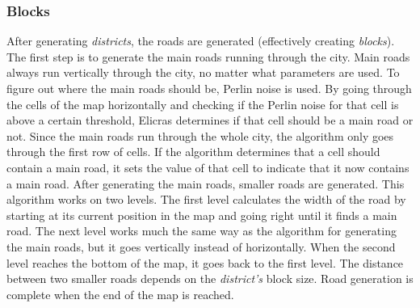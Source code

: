		\subsubsection{Blocks}
		After generating \textit{districts}, the roads are generated (effectively creating \textit{blocks}). The first step is to generate the main roads running through the city. Main roads always run vertically through the city, no matter what parameters are used. To figure out where the main roads should be, Perlin noise is used. By going through the cells of the map horizontally and checking if the Perlin noise for that cell is above a certain threshold, Elicras determines if that cell should be a main road or not. Since the main roads run through the whole city, the algorithm only goes through the first row of cells. If the algorithm determines that a cell should contain a main road, it sets the value of that cell to indicate that it now contains a main road. After generating the main roads, smaller roads are generated. This algorithm works on two levels. The first level calculates the width of the road by starting at its current position in the map and going right until it finds a main road. The next level works much the same way as the algorithm for generating the main roads, but it goes vertically instead of horizontally. When the second level reaches the bottom of the map, it goes back to the first level. The distance between two smaller roads depends on the \textit{district's} block size. Road generation is complete when the end of the map is reached.
		
